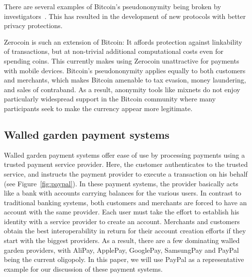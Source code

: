 \documentclass{IEEEtran}
\begin{document}

There are several examples of Bitcoin's pseudononymity being broken
by investigators~\cite{BTC:Anonymity}.  This has resulted in the
development of new protocols with better privacy protections.

Zerocoin \cite{miers2013zerocoin} is such an extension of Bitcoin:
It affords protection against linkability of transactions,
but at non-trivial additional computational costs even for
spending coins.  This currently makes using Zerocoin unattractive for payments
with mobile devices.
%
Bitcoin's pseudononymity applies equally to both customers and
merchants, which makes Bitcoin amen\-able to tax evasion, money
laundering, and sales of contraband.  As a result, anonymity tools
like mixnets do not enjoy particularly widespread support in the
Bitcoin community where many participants seek to make the currency
appear more legitimate.





\subsection{Walled garden payment systems}

Walled garden payment systems offer ease of use by processing payments
using a trusted payment service provider. Here, the customer
authenticates to the trusted service, and instructs the payment
provider to execute a transaction on his behalf
(see Figure~\ref{fig:paypal}).  In these payment systems, the provider
basically acts like a bank with accounts carrying balances for the
various users.  In contrast to traditional banking systems, both
customers and merchants are forced to have an account with the same
provider.  Each user must take the effort to establish his identity
with a service provider to create an account.  Merchants and customers
obtain the best interoperability in return for their account creation
efforts if they start with the biggest providers.  As a result, there
are a few dominating walled garden providers, with AliPay, ApplePay,
GooglePay, SamsungPay and PayPal being the current oligopoly.  In this
paper, we will use PayPal as a representative example for our discussion
of these payment systems.
\end{document}
